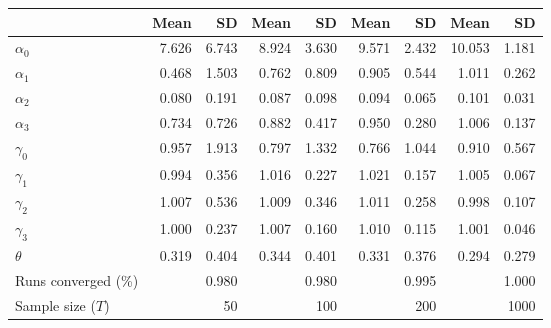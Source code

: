 
\begin{tabular}[t]{lrrrrrrrr}
\toprule
  & Mean & SD & Mean  & SD  & Mean   & SD   & Mean    & SD   \\
\midrule
$\alpha_{0}$ & 7.626 & 6.743 & 8.924 & 3.630 & 9.571 & 2.432 & 10.053 & 1.181\\
$\alpha_{1}$ & 0.468 & 1.503 & 0.762 & 0.809 & 0.905 & 0.544 & 1.011 & 0.262\\
$\alpha_{2}$ & 0.080 & 0.191 & 0.087 & 0.098 & 0.094 & 0.065 & 0.101 & 0.031\\
$\alpha_{3}$ & 0.734 & 0.726 & 0.882 & 0.417 & 0.950 & 0.280 & 1.006 & 0.137\\
$\gamma_{0}$ & 0.957 & 1.913 & 0.797 & 1.332 & 0.766 & 1.044 & 0.910 & 0.567\\
$\gamma_{1}$ & 0.994 & 0.356 & 1.016 & 0.227 & 1.021 & 0.157 & 1.005 & 0.067\\
$\gamma_{2}$ & 1.007 & 0.536 & 1.009 & 0.346 & 1.011 & 0.258 & 0.998 & 0.107\\
$\gamma_{3}$ & 1.000 & 0.237 & 1.007 & 0.160 & 1.010 & 0.115 & 1.001 & 0.046\\
$\theta$ & 0.319 & 0.404 & 0.344 & 0.401 & 0.331 & 0.376 & 0.294 & 0.279\\
Runs converged (\%) &  & 0.980 &  & 0.980 &  & 0.995 &  & 1.000\\
Sample size ($T$) &  & 50 &  & 100 &  & 200 &  & 1000\\
\bottomrule
\end{tabular}
